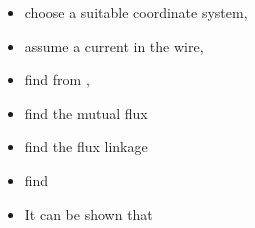 \begin{ELunit}
\begin{itemize}
  \begin{itemize}
  \tightlist
  \item
    choose a suitable coordinate system,
  \item
    assume a current  in the wire,
  \item
    find  from ,
  \item
    find the mutual flux
  \end{itemize}
\end{itemize}


\begin{itemize}
\tightlist
\item
  find the flux linkage
\end{itemize}


\begin{itemize}
\tightlist
\item
  find 
\end{itemize}


\end{ELunit}

\begin{ELjoin}

\begin{itemize}
\tightlist
\item
  It can be shown that
\end{itemize}

\begin{ELimportant}{}


\end{ELimportant}

\end{ELjoin}


